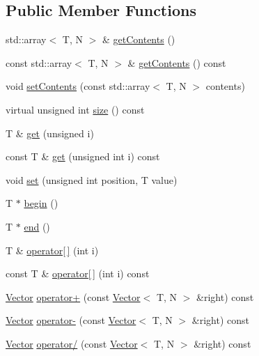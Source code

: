 \subsection*{Public Member Functions}
\begin{DoxyCompactItemize}
\item 
std\+::array$<$ T, N $>$ \& \hyperlink{classmc_1_1_vector_ad8649fb50d1cebdc4f7e2886f445560a}{get\+Contents} ()
\item 
const std\+::array$<$ T, N $>$ \& \hyperlink{classmc_1_1_vector_ac312084ca4f2fe312eec6799df7e3f22}{get\+Contents} () const 
\item 
void \hyperlink{classmc_1_1_vector_a2e674c851be8cf10808c86895e9ca86f}{set\+Contents} (const std\+::array$<$ T, N $>$ contents)
\item 
virtual unsigned int \hyperlink{classmc_1_1_vector_a85c37dc7b6c2ad12f5cab67d6db54b49}{size} () const 
\item 
T \& \hyperlink{classmc_1_1_vector_a3335869546b80addf0aafe5e009ffbde}{get} (unsigned i)
\item 
const T \& \hyperlink{classmc_1_1_vector_a58776300ccb5cac12fc04a24c9848053}{get} (unsigned int i) const 
\item 
void \hyperlink{classmc_1_1_vector_a11e1f8cfd518752bb19b35437c66ee9d}{set} (unsigned int position, T value)
\item 
T $\ast$ \hyperlink{classmc_1_1_vector_a1cb61e23c56abeb0b1d4c1a8b569e831}{begin} ()
\item 
T $\ast$ \hyperlink{classmc_1_1_vector_a728eef3a0e46669e5c7be8792a8b7b26}{end} ()
\item 
T \& \hyperlink{classmc_1_1_vector_a1113b584d428e6943e7ea23df89ef006}{operator\mbox{[}$\,$\mbox{]}} (int i)
\item 
const T \& \hyperlink{classmc_1_1_vector_a1bbd519ec7b6f6902ce81983478e3c92}{operator\mbox{[}$\,$\mbox{]}} (int i) const 
\item 
\hyperlink{classmc_1_1_vector}{Vector} \hyperlink{classmc_1_1_vector_a41f3ca26b2d43a91797df7499afcc5c5}{operator+} (const \hyperlink{classmc_1_1_vector}{Vector}$<$ T, N $>$ \&right) const 
\item 
\hyperlink{classmc_1_1_vector}{Vector} \hyperlink{classmc_1_1_vector_ac486a0798fd812967cb543c23bf60e3b}{operator-\/} (const \hyperlink{classmc_1_1_vector}{Vector}$<$ T, N $>$ \&right) const 
\item 
\hyperlink{classmc_1_1_vector}{Vector} \hyperlink{classmc_1_1_vector_a5760307dcf1bbc6ecbf4e576dc5c4838}{operator/} (const \hyperlink{classmc_1_1_vector}{Vector}$<$ T, N $>$ \&right) const 

\end{DoxyCompactItemize}
